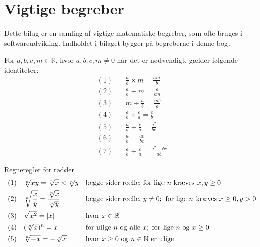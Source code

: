 \chapter{Vigtige begreber}
\label{chap:ic}

Dette bilag er en samling af vigtige matematiske begreber, som ofte bruges i softwareudvikling. 
Indholdet i bilaget bygger på begreberne i denne bog.


\begin{proposition}
For $a,b,c,m \in \mathbb{R}$, hvor $a,b,c,m \neq 0$ når det er nødvendigt, gælder følgende identiteter:
\begingroup
\setlength{\jot}{8pt} %
\begin{align*}
(1) & \quad \frac{a}{b} \times m = \frac{am}{b} \\
(2) & \quad \frac{a}{b} \div m = \frac{a}{bm} \\
(3) & \quad m \div \frac{a}{b} = \frac{mb}{a} \\
(4) & \quad \frac{a}{b} \times \frac{c}{a} = \frac{c}{b} \\
(5) & \quad \frac{a}{b} \div \frac{c}{a} = \frac{a^2}{bc} \\
(6) & \quad \frac{a}{b} = \frac{ac}{bc} \\
(7) & \quad \frac{a}{b} + \frac{c}{a} = \frac{a^2 + bc}{ab}
\end{align*}
\endgroup
\end{proposition}

\begin{proposition}{Regneregler for rødder}
    \begin{align*}
    &(1) \quad \sqrt[n]{x y}=\sqrt[n]{x} \times \sqrt[n]{y}   &   &\textnormal{begge sider reelle; for lige }n\textnormal{ kræves }x,y\geq0\\
    &(2) \quad \sqrt[n]{\frac{x}{y}} = \frac{\sqrt[n]{x}}{\sqrt[n]{y}}    &   &\textnormal{begge sider reelle, }y\neq0;\textnormal{ for lige }n\textnormal{ kræves }x\geq0,y>0 \\
    &(3) \quad \sqrt{x^2} = |x|   &   &\textnormal{hvor } x \in \mathbb{R} \\
    &(4) \quad (\sqrt[n]{x})^n = x    &   &\textnormal{for ulige }n\textnormal{ og alle }x;\ \textnormal{for lige }n\textnormal{ og }x\geq0\\
    &(5) \quad \sqrt[n]{-x}=-\sqrt[n]{x}  &   &\textnormal{hvor } x \geq 0 \textnormal{ og } n \in \mathbb{N} \textnormal{ er ulige }
    \end{align*}
\end{proposition}

